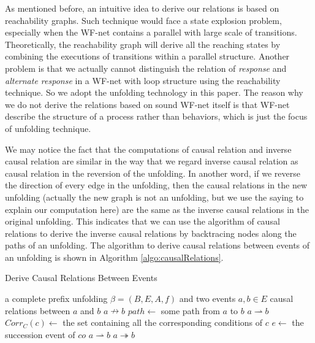 \documentclass{llncs}
\begin{document}
As mentioned before, an intuitive idea to derive our relations is based on reachability graphs. Such technique would face a state explosion problem, especially when the WF-net contains a parallel with large scale of transitions. Theoretically, the reachability graph will derive all the reaching states by combining the executions of transitions within a parallel structure. Another problem is that we actually cannot distinguish the relation of \textit{response} and \textit{alternate response} in a WF-net with loop structure using the reachability technique. So we adopt the unfolding technology in this paper. The reason why we do not derive the relations based on sound WF-net itself is that WF-net describe the structure of a process rather than behaviors, which is just the focus of unfolding technique.

We may notice the fact that the computations of causal relation and inverse causal relation are similar in the way that we regard inverse causal relation as causal relation in the reversion of the unfolding. In another word, if we reverse the direction of every edge in the unfolding, then the causal relations in the new unfolding (actually the new graph is not an unfolding, but we use the saying to explain our computation here) are the same as the inverse causal relations in the original unfolding. This indicates that we can use the algorithm of causal relations to derive the inverse causal relations by backtracing nodes along the paths of an unfolding. The algorithm to derive causal relations between events of an unfolding is shown in Algorithm \ref{algo:causalRelations}. 

\begin{algorithm}[ht]
\caption{Derive Causal Relations Between Events}
\label{algo:causalRelations}
	\begin{algorithmic}
		\Require a complete prefix unfolding $\beta=(B,E,A,f)$ and two events $a,b\in E$
		\Ensure causal relations between $a$ and $b$
			\State \Return $a\nrightarrow b$
		\EndIf
		\State $path\gets$ some path from $a$ to $b$
			\State \Return $a\rightharpoonup b$
		\Else
				\State $Corr_{C}(c)\gets$ the set containing all the corresponding conditions of $c$
					\State $e\gets$ the succession event of $co$
						\State \Return $a\rightharpoonup b$
					\EndIf
				\EndFor
			\EndFor
		\EndIf
		\State \Return $a\twoheadrightarrow b$
	\end{algorithmic}
\end{algorithm}
\end{document}
